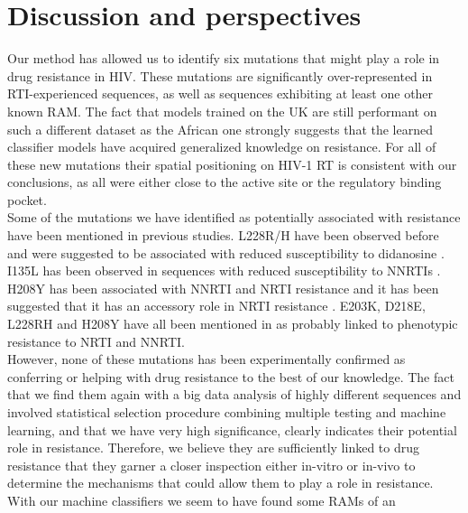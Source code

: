 \documentclass[
  11,
]{scrbook}
\begin{document}
\hypertarget{discussion-and-perspectives}{%
\section{Discussion and perspectives}\label{discussion-and-perspectives}}

Our method has allowed us to identify six mutations that might play a
role in drug resistance in HIV. These mutations are significantly
over-represented in RTI-experienced sequences, as well as sequences
exhibiting at least one other known RAM. The fact that models trained on
the UK are still performant on such a different dataset as the African
one strongly suggests that the learned classifier models have acquired
generalized knowledge on resistance. For all of these new mutations
their spatial positioning on HIV-1 RT is consistent with our
conclusions, as all were either close to the active site or the
regulatory binding pocket.\\
Some of the mutations we have identified as potentially associated with
resistance have been mentioned in previous studies. L228R/H have been
observed before \autocite{rheeHIV1SubtypeProtease2007} and were suggested to be
associated with reduced susceptibility to didanosine
\autocite{delucaImprovedInterpretationGenotypic2007,marcelinImpactHIV1Reverse2006}.
I135L has been observed in sequences with reduced susceptibility to
NNRTIs \autocite{brownReducedSusceptibilityHuman2000}. H208Y has been associated
with NNRTI and NRTI resistance \autocite{clarkReverseTranscriptaseMutations2006}
and it has been suggested that it has an accessory role in NRTI
resistance \autocite{nebbiaEmergenceH208YMutation2007}. E203K, D218E, L228RH and
H208Y have all been mentioned in \autocite{saracinoImpactUnreportedHIV12006} as
probably linked to phenotypic resistance to NRTI and NNRTI.\\
However, none of these mutations has been experimentally confirmed as
conferring or helping with drug resistance to the best of our knowledge.
The fact that we find them again with a big data analysis of highly
different sequences and involved statistical selection procedure
combining multiple testing and machine learning, and that we have very
high significance, clearly indicates their potential role in resistance.
Therefore, we believe they are sufficiently linked to drug resistance
that they garner a closer inspection either in-vitro or in-vivo to
determine the mechanisms that could allow them to play a role in
resistance.\\
With our machine classifiers we seem to have found some RAMs of an
\end{document}
